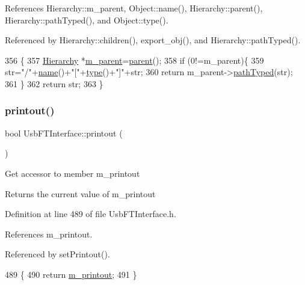 References Hierarchy\+::m\+\_\+parent, Object\+::name(), Hierarchy\+::parent(), Hierarchy\+::path\+Typed(), and Object\+::type().



Referenced by Hierarchy\+::children(), export\+\_\+obj(), and Hierarchy\+::path\+Typed().


\begin{DoxyCode}
356                                            \{
357   \hyperlink{classHierarchy}{Hierarchy} *\hyperlink{classHierarchy_a5814bb280d4e8539ab25ab6cbfb9cc4f}{m\_parent}=\hyperlink{classHierarchy_a1c7bec8257e717f9c1465e06ebf845fc}{parent}();
358   \textcolor{keywordflow}{if} (0!=m\_parent)\{
359     str=\textcolor{stringliteral}{"/"}+\hyperlink{classObject_a300f4c05dd468c7bb8b3c968868443c1}{name}()+\textcolor{stringliteral}{"["}+\hyperlink{classObject_a84f99f70f144a83e1582d1d0f84e4e62}{type}()+\textcolor{stringliteral}{"]"}+str;
360     \textcolor{keywordflow}{return} m\_parent->\hyperlink{classHierarchy_a1efd56cd164d328d2002e53a10a19b8c}{pathTyped}(str);
361   \}
362   \textcolor{keywordflow}{return} str;
363 \}
\end{DoxyCode}
\mbox{\label{classUsbFTInterface_ad312ac511dfb57c513f2998de396ba9b}} 
\subsubsection{\texorpdfstring{printout()}{printout()}}
{\footnotesize\ttfamily bool Usb\+F\+T\+Interface\+::printout (\begin{DoxyParamCaption}{ }\end{DoxyParamCaption})\hspace{0.3cm}{\ttfamily [inline]}}

Get accessor to member m\+\_\+printout \begin{DoxyReturn}{Returns}
the current value of m\+\_\+printout 
\end{DoxyReturn}


Definition at line 489 of file Usb\+F\+T\+Interface.\+h.



References m\+\_\+printout.



Referenced by set\+Printout().


\begin{DoxyCode}
489                    \{
490     \textcolor{keywordflow}{return} \hyperlink{classUsbFTInterface_aa4d5f5ffb4d3b26f1effdf84087aea91}{m\_printout};
491   \}
\end{DoxyCode}
\mbox{\label{classUsbFTInterface_a9f213ab1804e61af476bbdd3ade2d053}} 
